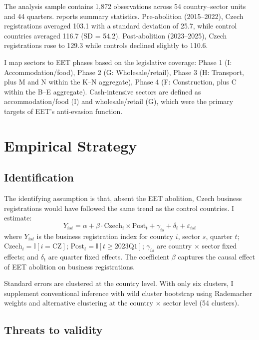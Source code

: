 \documentclass[12pt]{article}
\newcommand{\ind}{\mathbb{I}}
\begin{document}
The analysis sample contains 1,872 observations across 54 country--sector units and 44 quarters.  reports summary statistics. Pre-abolition (2015--2022), Czech registrations averaged 103.1 with a standard deviation of 25.7, while control countries averaged 116.7 (SD = 54.2). Post-abolition (2023--2025), Czech registrations rose to 129.3 while controls declined slightly to 110.6.

I map sectors to EET phases based on the legislative coverage: Phase 1 (I: Accommodation/food), Phase 2 (G: Wholesale/retail), Phase 3 (H: Transport, plus M and N within the K--N aggregate), Phase 4 (F: Construction, plus C within the B--E aggregate). Cash-intensive sectors are defined as accommodation/food (I) and wholesale/retail (G), which were the primary targets of EET's anti-evasion function.




\section{Empirical Strategy}

\subsection{Identification}

The identifying assumption is that, absent the EET abolition, Czech business registrations would have followed the same trend as the control countries. I estimate:
\begin{equation}
Y_{ist} = \alpha + \beta \cdot \text{Czech}_i \times \text{Post}_t + \gamma_{is} + \delta_t + \varepsilon_{ist}
\label{eq:did}
\end{equation}
where $Y_{ist}$ is the business registration index for country $i$, sector $s$, quarter $t$; $\text{Czech}_i = \ind[i = \text{CZ}]$; $\text{Post}_t = \ind[t \geq \text{2023Q1}]$; $\gamma_{is}$ are country $\times$ sector fixed effects; and $\delta_t$ are quarter fixed effects. The coefficient $\beta$ captures the causal effect of EET abolition on business registrations.

Standard errors are clustered at the country level. With only six clusters, I supplement conventional inference with wild cluster bootstrap using Rademacher weights \citep{cameron2008bootstrap} and alternative clustering at the country $\times$ sector level (54 clusters).

\subsection{Threats to validity}
\end{document}
